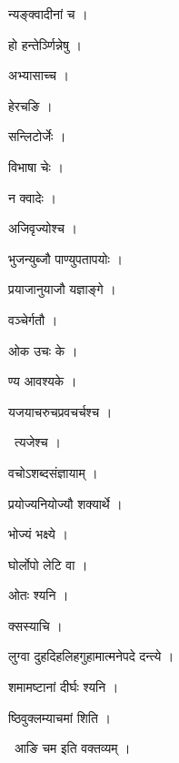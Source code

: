\documentclass[10pt, openany, oneside]{book}
\begin{document}
\noindent न्यङ्क्वादीनां च ।

\noindent हो हन्तेर्ञ्णिन्नेषु ।

\noindent अभ्यासाच्च ।

\noindent हेरचङि ।

\noindent सन्लिटोर्जेः ।

\noindent विभाषा चेः ।

\noindent न क्वादेः ।

\noindent अजिवृज्योश्च ।

\noindent भुजन्युब्जौ पाण्युपतापयोः ।

\noindent प्रयाजानुयाजौ यज्ञाङ्गे ।

\noindent वञ्चेर्गतौ ।

\noindent ओक उचः के ।

\noindent ण्य आवश्यके ।

\noindent यजयाचरुचप्रवचर्चश्च ।

\par\noindent\hspace{1.5em}{\vps वा॰}~{\qt त्यजेश्च ।}

\noindent वचोऽशब्दसंज्ञायाम् ।

\noindent प्रयोज्यनियोज्यौ शक्यार्थे ।

\noindent भोज्यं भक्ष्ये ।

\noindent घोर्लोपो लेटि वा ।

\noindent ओतः श्यनि ।

\noindent क्सस्याचि ।

\noindent लुग्वा दुहदिहलिहगुहामात्मनेपदे दन्त्ये ।

\noindent शमामष्टानां दीर्घः श्यनि ।

\noindent ष्ठिवुक्लम्याचमां शिति ।

\par\noindent\hspace{1.5em}{\vps वा॰}~{\qt आङि चम इति वक्तव्यम् ।}
\end{document}
